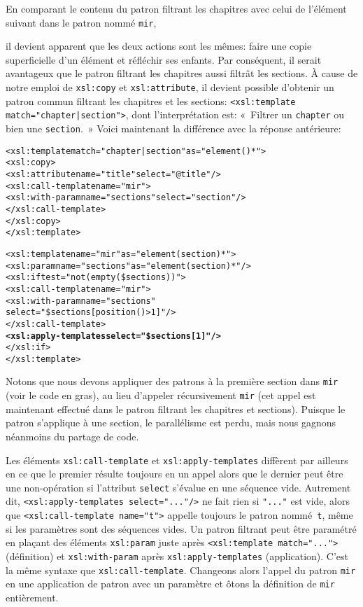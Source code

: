 En comparant le contenu du patron filtrant les chapitres avec celui de
l'élément suivant dans le patron nommé \texttt{mir},
il devient apparent que les deux actions sont les mêmes: faire une
copie superficielle d'un élément et réfléchir ses enfants. Par
conséquent, il serait avantageux que le patron filtrant les chapitres
aussi filtrât les sections. À cause de notre emploi de
\texttt{xsl:copy} et \texttt{xsl:attribute}, il devient possible
d'obtenir un patron commun filtrant les chapitres et les sections:
\texttt{<xsl:template match="chapter|section">}, dont l'interprétation
est: «~Filtrer un \texttt{chapter} ou bien une \texttt{section}.~» Voici
maintenant la différence avec la réponse antérieure:
\begin{alltt}
\small  <xsl:template match="chapter|section" as="element()*">
    <xsl:copy>
      <xsl:attribute name="title" select="@title"/>
      <xsl:call-template name="mir">
        <xsl:with-param name="sections" select="section"/>
      </xsl:call-template>
    </xsl:copy>
  </xsl:template>

  <xsl:template name="mir" as="element(section)*">
    <xsl:param name="sections" as="element(section)*"/>
    <xsl:if test="not(empty(\$sections))">
      <xsl:call-template name="mir">
        <xsl:with-param name="sections"
                        select="\$sections[position()>1]"/>
      </xsl:call-template>
      \textbf{<xsl:apply-templates select="\$sections[1]"/>}
    </xsl:if>
  </xsl:template>
\end{alltt}
Notons que nous devons appliquer des patrons à la première section
dans \texttt{mir} (voir le code en gras), au lieu d'appeler
récursivement \texttt{mir} (cet appel est maintenant effectué dans le
patron filtrant les chapitres et sections). Puisque le patron
s'applique à une section, le parallélisme est perdu, mais nous gagnons
néanmoins du partage de code.

Les éléments \texttt{xsl:call-template} et
\texttt{xsl:apply-templates} diffèrent par ailleurs en ce que le
premier résulte toujours en un appel alors que le dernier peut être
une non-opération si l'attribut \texttt{select} s'évalue en une
séquence vide. Autrement dit, \texttt{<xsl:apply-templates
  select="..."/>} ne fait rien si \texttt{"..."} est vide, alors que
\texttt{<xsl:call-template name="t">} appelle toujours le patron
nommé~\texttt{t}, même si les paramètres sont des séquences vides. Un
patron filtrant peut être paramétré en plaçant des éléments
\texttt{xsl:param} juste après \texttt{<xsl:template match="...">}
(définition) et \texttt{xsl:with-param} après
\texttt{xsl:apply-templates} (application). C'est la même syntaxe que
\texttt{xsl:call-template}. Changeons alors l'appel du patron
\texttt{mir} en une application de patron avec un paramètre et ôtons
la définition de \texttt{mir} entièrement.

